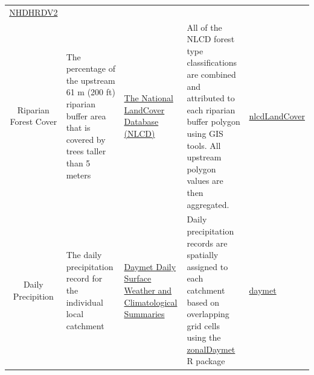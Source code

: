 \documentclass[]{article}
\begin{document}
\begin{longtable}[c]{@{}cllll@{}}
\begin{minipage}[t]{0.16\columnwidth}
\href{https://github.com/Conte-Ecology/shedsData/tree/master/NHDHRDV2}{NHDHRDV2}
\strut\end{minipage}\tabularnewline
\begin{minipage}[t]{0.10\columnwidth}\centering\strut
Riparian Forest Cover
\strut\end{minipage} &
\begin{minipage}[t]{0.24\columnwidth}\raggedright\strut
The percentage of the upstream 61 m (200 ft) riparian buffer area that
is covered by trees taller than 5 meters
\strut\end{minipage} &
\begin{minipage}[t]{0.14\columnwidth}\raggedright\strut
\href{http://www.mrlc.gov/nlcd06_data.php}{The National LandCover
Database (NLCD)}
\strut\end{minipage} &
\begin{minipage}[t]{0.23\columnwidth}\raggedright\strut
All of the NLCD forest type classifications are combined and attributed
to each riparian buffer polygon using GIS tools. All upstream polygon
values are then aggregated.
\strut\end{minipage} &
\begin{minipage}[t]{0.16\columnwidth}\raggedright\strut
\href{https://github.com/Conte-Ecology/shedsData/tree/master/basinCharacteristics/rasterPrep/nlcdLandCover}{nlcdLandCover}
\strut\end{minipage}\tabularnewline
\begin{minipage}[t]{0.10\columnwidth}\centering\strut
Daily Precipition
\strut\end{minipage} &
\begin{minipage}[t]{0.24\columnwidth}\raggedright\strut
The daily precipitation record for the individual local catchment
\strut\end{minipage} &
\begin{minipage}[t]{0.14\columnwidth}\raggedright\strut
\href{https://daymet.ornl.gov/}{Daymet Daily Surface Weather and
Climatological Summaries}
\strut\end{minipage} &
\begin{minipage}[t]{0.23\columnwidth}\raggedright\strut
Daily precipitation records are spatially assigned to each catchment
based on overlapping grid cells using the
\href{https://github.com/Conte-Ecology/zonalDaymet}{zonalDaymet} R
package
\strut\end{minipage} &
\begin{minipage}[t]{0.16\columnwidth}\raggedright\strut
\href{https://github.com/Conte-Ecology/shedsData/tree/master/daymet}{daymet}

\end{minipage}
\end{longtable}
\end{document}
